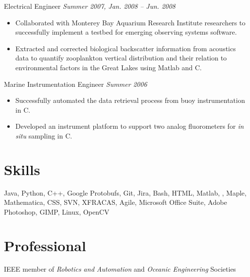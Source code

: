 \documentclass{article}
\begin{document}
{\begin{multicols}{2}
\begin{itemize}
    \end{itemize}
    \vspace{5px}
    Electrical Engineer  \hfill \textsl{Summer 2007, Jan. 2008 -- Jun. 2008}  \\
    \vspace{ -10px}	
    \begin{itemize}[noitemsep,nolistsep]
	\item Collaborated with Monterey Bay Aquarium Research Institute researchers to successfully implement a testbed for emerging observing systems software.
	\item Extracted and corrected biological backscatter information from acoustics data to quantify zooplankton vertical distribution and their relation to environmental factors in the Great Lakes using Matlab and C.
    \end{itemize}
    \vspace{5px}
    Marine Instrumentation Engineer \hfill \textsl{Summer 2006} \\
    \vspace{ -10px}	
    \begin{itemize}[noitemsep,nolistsep]
	\item Successfully automated the data retrieval process from buoy instrumentation in C. 
	\item Developed an instrument platform to support two analog fluorometers for \textit{in situ} sampling in C. 
    \end{itemize}
    \vspace{5px}
    \section*{Skills} 
    \noindent
    Java, Python, C++, Google Protobufs, Git, Jira, Bash, HTML, Matlab, \LaTeXe, Maple, Mathematica, CSS, SVN, XFRACAS, Agile, Microsoft Office Suite, Adobe Photoshop, GIMP, Linux, OpenCV
    \section*{Professional} 
    \noindent
    IEEE member of \textsl{Robotics and Automation} and \textsl{Oceanic Engineering} Societies  
\end{multicols}
}
\end{document}
